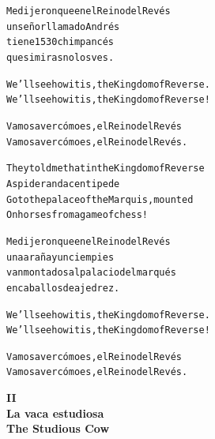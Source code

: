 \documentclass[11pt]{article}
\begin{document}
\begin{parcolumns}[distance=8em,nofirstindent=true]{2}
\colchunk
{
\begin{alltt}\normalfont
Me dijeron que en el Reino del Revés
un señor llamado Andrés
tiene 1530 chimpancés
que si miras no los ves.
\end{alltt}
}

\colplacechunks

\colchunk
{
\begin{alltt}\normalfont
We’ll see how it is, the Kingdom of Reverse.
We’ll see how it is, the Kingdom of Reverse!
\end{alltt}
}

\colchunk
{
\begin{alltt}\normalfont
Vamos a ver cómo es, el Reino del Revés
Vamos a ver cómo es, el Reino del Revés.
\end{alltt}
}

\colplacechunks

\colchunk
{
\begin{alltt}\normalfont
They told me that in the Kingdom of Reverse
A spider and a centipede
Go to the palace of the Marquis, mounted
On horses from a game of chess!
\end{alltt}
}

\colchunk
{
\begin{alltt}\normalfont
Me dijeron que en el Reino del Revés
una araña y un ciempies
van montados al palacio del marqués
en caballos de ajedrez.
\end{alltt}
}

\colplacechunks

\colchunk
{
\begin{alltt}\normalfont
We’ll see how it is, the Kingdom of Reverse.
We’ll see how it is, the Kingdom of Reverse!
\end{alltt}
}

\colchunk
{
\begin{alltt}\normalfont
Vamos a ver cómo es, el Reino del Revés
Vamos a ver cómo es, el Reino del Revés.
\end{alltt}
}

\colplacechunks

\end{parcolumns}

\clearpage

\begin{center}
\large\textbf{
II\\
La vaca estudiosa\\
The Studious Cow
}
\end{center}
\end{document}
